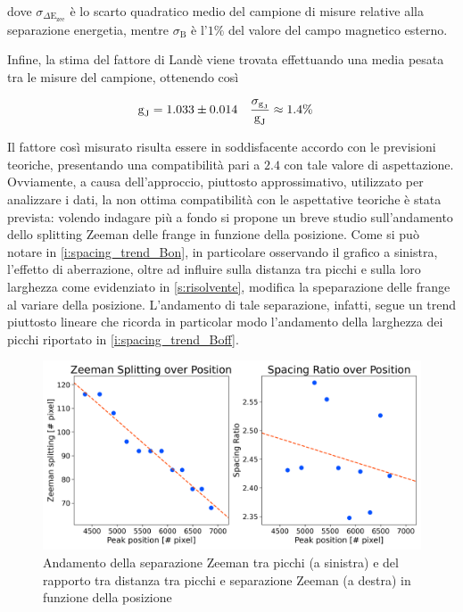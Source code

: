 \documentclass[twocolumn,10pt]{asme2ej}
\begin{document}
\noindent dove $\sigma_{\Delta \text{E}_{\text{zee}}}$ è lo scarto quadratico medio del campione di misure relative alla
separazione energetia, mentre $\sigma_{\text{B}}$ è l'$1\%$ del valore del campo magnetico esterno. 

Infine, la stima del fattore di Landè viene trovata effettuando una media pesata tra le misure del campione, ottenendo
così 

\vspace{-15pt}
\begin{align*}
    \text{g}_{\text{J}} &= 1.033 \pm 0.014 & \frac{\sigma_{\text{g}_{\text{J}}}}{\text{g}_{\text{J}}} &\approx 1.4\%
    \vspace{-5pt}
\end{align*}

Il fattore così misurato risulta essere in soddisfacente accordo con le previsioni teoriche, presentando una
compatibilità pari a $2.4$ con tale valore di aspettazione. Ovviamente, a causa dell'approccio, piuttosto
approssimativo, utilizzato per analizzare i dati, la non ottima compatibilità con le aspettative teoriche è stata
prevista: volendo indagare più a fondo si propone un breve studio sull'andamento dello splitting Zeeman delle frange in
funzione della posizione. Come si può notare in \autoref{i:spacing_trend_Bon}, in particolare osservando il grafico a
sinistra, l'effetto di aberrazione, oltre ad influire sulla distanza tra picchi e sulla loro larghezza come evidenziato
in \autoref{s:risolvente}, modifica la speparazione delle frange al variare della posizione. L'andamento di tale
separazione, infatti, segue un trend piuttosto lineare che ricorda in particolar modo l'andamento della larghezza dei
picchi riportato in \autoref{i:spacing_trend_Boff}.


\begin{figure}
    \centering
    \includegraphics[width=\linewidth]{../Plots/Bon_zeeman_trend.png}
    \caption{Andamento della separazione Zeeman tra picchi (a sinistra) e del rapporto tra distanza tra picchi e separazione Zeeman (a destra) in funzione della posizione}
    \label{i:spacing_trend_Bon}
    \vspace{-10pt}
\end{figure}
\end{document}
